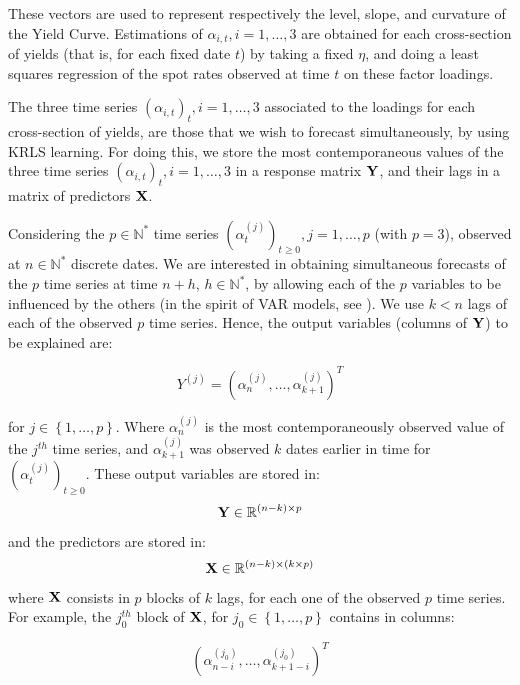 \medskip

These vectors are used to represent respectively the level, slope, and curvature of the Yield Curve. Estimations of $\alpha_{i, t}, i = 1, \ldots, 3$ are obtained for each cross-section of yields (that is, for each fixed date $t$) by taking a fixed $\eta$, and doing a least squares regression of the spot rates observed at time $t$ on these factor loadings. 

\medskip

The three time series $(\alpha_{i, t})_t, i = 1, \ldots, 3$ associated to the loadings for each cross-section of yields, are those that we wish to forecast simultaneously, by using KRLS learning. For doing this, we store the most contemporaneous values of the three time series $(\alpha_{i, t})_t, i = 1, \ldots, 3$ in a response matrix ${\bf Y}$, and their lags in a matrix of predictors ${\bf X}$. 

\medskip

Considering the $p \in \mathbb{N}^*$ time series $(\alpha_t^{(j)})_{t \geq 0}, j = 1, \ldots, p$ (with $p = 3$),
observed at $n \in \mathbb{N}^*$ discrete dates. We are interested in
obtaining simultaneous forecasts of the $p$ time series at time $n+h$, $h \in
\mathbb{N}^*$, by allowing each of the $p$ variables to be influenced by the
others (in the spirit of VAR models, see \cite{lutkepohl2005new}). We use $k < n$ lags of each of the observed $p$ time series. Hence, the output variables (columns of ${\bf Y}$) to be explained are:

\begin{equation}
Y^{(j)} = \left(\alpha^{(j)}_n, \ldots, \alpha^{(j)}_{k+1} \right)^T
\end{equation}

for $j \in \left\lbrace 1, \ldots,
p \right\rbrace$. Where $\alpha^{(j)}_n$ is the most contemporaneously observed value
of the $j^{th}$ time series, and $\alpha^{(j)}_{k+1}$ was observed $k$ dates earlier
in time for $(\alpha^{(j)}_t)_{t \geq 0}$. These output variables are stored in: $$ {\bf Y} \in \mathbb{R}^{(n-k) \times p} $$ and the predictors are
stored in: $$ {\bf X} \in \mathbb{R}^{(n-k) \times (k \times p)} $$
where ${\bf X}$ consists in $p$ blocks of $k$ lags, for each one of the observed
$p$ time series. For example, the $j_0^{th}$ block of ${\bf X}$, for $j_0 \in
\left\lbrace 1, \ldots, p \right\rbrace$  contains in columns:

\begin{equation}
\left( \alpha^{(j_0)}_{n-i}, \ldots, \alpha^{(j_0)}_{k+1-i} \right)^T
\end{equation}

